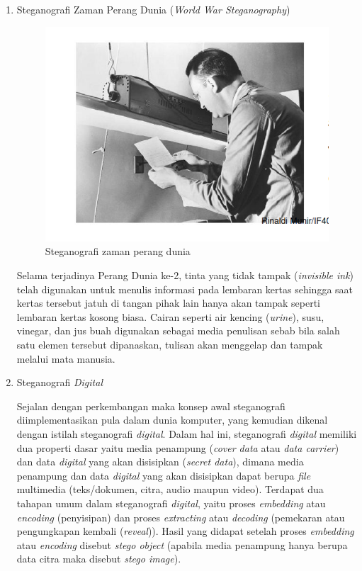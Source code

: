 \begin{enumerate}
		\item Steganografi Zaman Perang Dunia (\emph{World War Steganography})
		
		\begin{figure}[H]
			\centering
			\includegraphics[width=1\textwidth]{gambar/steganografi_perangdunia}
			\caption{Steganografi zaman perang dunia}
			\label{steganografi_perangdunia}
		\end{figure}
	
		Selama terjadinya Perang Dunia ke-2, tinta yang tidak tampak (\emph{invisible ink}) telah digunakan untuk menulis informasi pada lembaran kertas sehingga saat kertas tersebut jatuh di tangan pihak lain hanya akan tampak seperti lembaran kertas kosong biasa. Cairan seperti air kencing (\emph{urine}), susu, vinegar, dan jus buah digunakan sebagai media penulisan sebab bila salah satu elemen tersebut dipanaskan, tulisan akan menggelap dan tampak melalui mata manusia. \cite{munir}
		
		\item Steganografi \emph{Digital}
		
		Sejalan dengan perkembangan maka konsep awal steganografi diimplementasikan pula dalam dunia komputer, yang kemudian dikenal dengan istilah steganografi \emph{digital}. Dalam hal ini, steganografi \emph{digital} memiliki dua properti dasar yaitu media penampung (\emph{cover data} atau \emph{data carrier}) dan data \emph{digital} yang akan disisipkan (\emph{secret data}), dimana media penampung dan data \emph{digital} yang akan disisipkan dapat berupa \emph{file} multimedia (teks/dokumen, citra, audio maupun video). Terdapat dua tahapan umum dalam steganografi \emph{digital}, yaitu proses \emph{embedding} atau \emph{encoding} (penyisipan) dan proses \emph{extracting} atau \emph{decoding} (pemekaran atau pengungkapan kembali (\emph{reveal})). Hasil yang didapat setelah proses \emph{embedding} atau \emph{encoding} disebut \emph{stego object} (apabila media penampung hanya berupa data citra maka disebut \emph{stego image}). \cite{prayudi}
	\end{enumerate}

